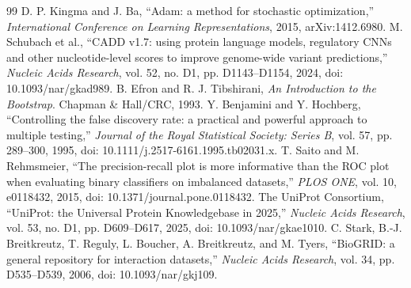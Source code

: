 \documentclass[conference]{IEEEtran}
\begin{document}
\begin{thebibliography}{99}
 D. P. Kingma and J. Ba, ``Adam: a method for stochastic optimization,'' \emph{International Conference on Learning Representations}, 2015, arXiv:1412.6980.
 M. Schubach et al., ``CADD v1.7: using protein language models, regulatory CNNs and other nucleotide-level scores to improve genome-wide variant predictions,'' \emph{Nucleic Acids Research}, vol. 52, no. D1, pp. D1143--D1154, 2024, doi: 10.1093/nar/gkad989.
 B. Efron and R. J. Tibshirani, \emph{An Introduction to the Bootstrap}. Chapman \& Hall/CRC, 1993.
 Y. Benjamini and Y. Hochberg, ``Controlling the false discovery rate: a practical and powerful approach to multiple testing,'' \emph{Journal of the Royal Statistical Society: Series B}, vol. 57, pp. 289--300, 1995, doi: 10.1111/j.2517-6161.1995.tb02031.x.
 T. Saito and M. Rehmsmeier, ``The precision-recall plot is more informative than the ROC plot when evaluating binary classifiers on imbalanced datasets,'' \emph{PLOS ONE}, vol. 10, e0118432, 2015, doi: 10.1371/journal.pone.0118432.
 The UniProt Consortium, ``UniProt: the Universal Protein Knowledgebase in 2025,'' \emph{Nucleic Acids Research}, vol. 53, no. D1, pp. D609--D617, 2025, doi: 10.1093/nar/gkae1010.
 C. Stark, B.-J. Breitkreutz, T. Reguly, L. Boucher, A. Breitkreutz, and M. Tyers, ``BioGRID: a general repository for interaction datasets,'' \emph{Nucleic Acids Research}, vol. 34, pp. D535--D539, 2006, doi: 10.1093/nar/gkj109.
\end{thebibliography}
\end{document}
